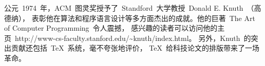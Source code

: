 \documentclass[a4paper,11pt,         %
               twoside,              %
               ]{article}
\begin{document}
\begin{abstract}
\noindent %
这是一个简单的~\LaTeX+CJK~的模板，为~\TeX~的初学者提供便利上手的参照。
该模板在FreeBSD+te，适合在UNIX下工作的朋友。
从一个简单的模板出发，不断地提升对~\TeX~的认识，培养良好的写作风格。
网上有大量的资料，我推荐~\LaTeX~编辑部：http://zzg34b.w3.c361.com/index.htm，
那里能找到国内外许多期刊的模板和一些高校博/硕士论文的模板。祝玩儿得开心！
\end{abstract}

\PencilRightUp %
公元~1974~年，ACM~图灵奖授予了~Standford~大学教授~Donald E. Knuth~（高德纳），
表彰他在算法和程序语言设计等多方面杰出的成就。他的巨著~The Art of Computer Programming~令人震撼，
感兴趣的读者可以访问他的主页~http://www-cs-faculty.stanford.edu/\~{}knuth/index.html。
另外，Knuth~的突出贡献还包括~\TeX~系统，毫不夸张地评价，
\TeX~给科技论文的排版带来了一场革命。
\end{document}
